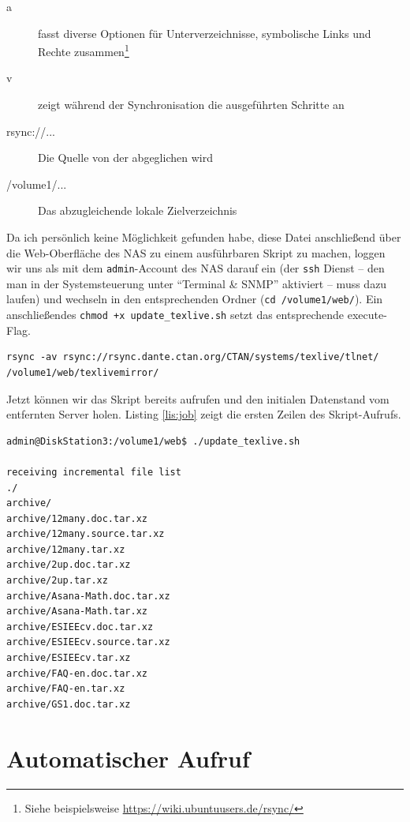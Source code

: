 \documentclass{dtk}
\begin{document}
\begin{description}
\item[a] fasst diverse Optionen für Unterverzeichnisse, symbolische Links und Rechte zusammen\footnote{Siehe beispielsweise \url{https://wiki.ubuntuusers.de/rsync/}}
\item[v] zeigt während der Synchronisation die ausgeführten Schritte an
\item [rsync://...] Die Quelle von der abgeglichen wird
\item [/volume1/...] Das abzugleichende lokale Zielverzeichnis
\end{description}

Da ich persönlich keine Möglichkeit gefunden habe, diese Datei anschließend über die Web-Oberfläche des NAS zu einem ausführbaren Skript zu machen, loggen wir uns als mit dem \texttt{admin}-Account des NAS darauf ein (der \texttt{ssh} Dienst -- den man in der Systemsteuerung unter \enquote{Terminal \& SNMP} aktiviert -- muss dazu laufen) und wechseln in den entsprechenden Ordner (\texttt{cd /volume1/web/}). Ein anschließendes \verb|chmod +x update_texlive.sh| setzt das entsprechende execute-Flag.

\begin{lstlisting}[label={lis:rsync},caption={\texttt{update\textunderscore texlive.sh}, das \texttt{rsync} Skript für die Synchronisation}]
rsync -av rsync://rsync.dante.ctan.org/CTAN/systems/texlive/tlnet/ /volume1/web/texlivemirror/
\end{lstlisting}

Jetzt können wir das Skript bereits aufrufen und den initialen Datenstand vom entfernten Server holen. Listing \ref{lis:job} zeigt die ersten Zeilen des Skript-Aufrufs.

\begin{lstlisting}[label={lis:job},caption={Die ersten Output-Zeilen des ersten Skript-Aufrufs}]
admin@DiskStation3:/volume1/web$ ./update_texlive.sh

receiving incremental file list
./
archive/
archive/12many.doc.tar.xz
archive/12many.source.tar.xz
archive/12many.tar.xz
archive/2up.doc.tar.xz
archive/2up.tar.xz
archive/Asana-Math.doc.tar.xz
archive/Asana-Math.tar.xz
archive/ESIEEcv.doc.tar.xz
archive/ESIEEcv.source.tar.xz
archive/ESIEEcv.tar.xz
archive/FAQ-en.doc.tar.xz
archive/FAQ-en.tar.xz
archive/GS1.doc.tar.xz
\end{lstlisting}


\section{Automatischer Aufruf}
\end{document}
